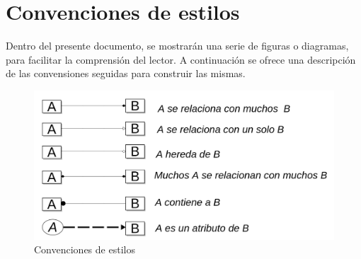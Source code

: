 	
\section{Convenciones de estilos}
\label{sec:style_conventios}
	
Dentro del presente documento, se mostrarán una serie de figuras o diagramas, para facilitar la comprensión del lector. A continuación se ofrece una descripción de las convensiones seguidas para construir las mismas.
	
\begin{figure}[h!]
	\centering
	\includegraphics[width=1\linewidth]{images/Introduction/style_conventions}
	\caption{Convenciones de estilos}
	\label{fig:style_conventions}
\end{figure}
	
	

